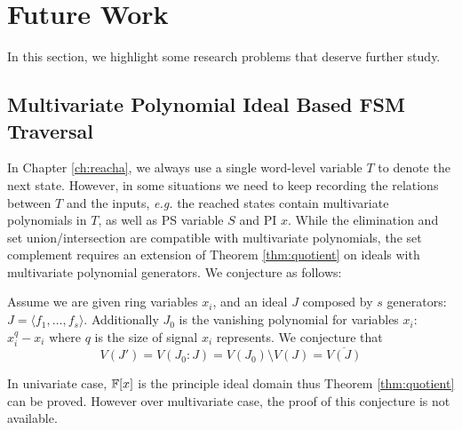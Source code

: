 \section{Future Work}
In this section, we highlight some research problems that deserve further study.
\subsection{Multivariate Polynomial Ideal Based FSM Traversal}
In Chapter \ref{ch:reacha}, we always use a single word-level variable $T$ to denote the
next state. However, in some situations we need to keep recording the relations between $T$ and
the inputs, {\it e.g.} the reached states contain multivariate polynomials in $T$, as well as 
PS variable $S$ and PI $x$. 
While the elimination and set union/intersection are compatible with multivariate polynomials,
the set complement requires an extension of Theorem \ref{thm:quotient} on ideals with 
multivariate polynomial generators. We conjecture as follows:

\begin{Conjecture}
Assume we are given ring variables $x_i$, and an ideal $J$ composed by $s$ generators:
$J = \langle f_1,\dots, f_s\rangle$.  Additionally $J_0$ is the vanishing polynomial for variables
$x_i$: $ x_i^{q} - x_i$ where $q$ is the size of signal $x_i$ represents.
We conjecture that
$$V(J') = V(J_0:J) = V(J_0)\setminus V(J) = \overline{V(J)}$$
\end{Conjecture}

In univariate case, ${\mathbb{F}}[x]$ is the principle ideal domain thus Theorem \ref{thm:quotient} can be proved.
However over multivariate case, the proof of this conjecture is not available.

